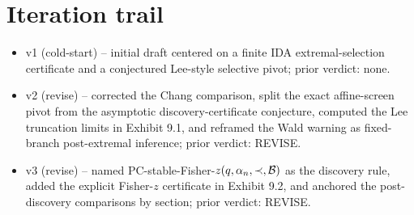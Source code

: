 \documentclass[11pt]{article}
\theoremstyle{definition}
\theoremstyle{plain}
\theoremstyle{remark}
\begin{document}
\section{Iteration trail}
\begin{itemize}[leftmargin=*]
\item v1 (cold-start) -- initial draft centered on a finite IDA extremal-selection certificate and a conjectured Lee-style selective pivot; prior verdict: none.
\item v2 (revise) -- corrected the Chang comparison, split the exact affine-screen pivot from the asymptotic discovery-certificate conjecture, computed the Lee truncation limits in Exhibit 9.1, and reframed the Wald warning as fixed-branch post-extremal inference; prior verdict: REVISE.
\item v3 (revise) -- named PC-stable-Fisher-\(z(q,\alpha_n,\prec,{\cal B})\) as the discovery rule, added the explicit Fisher-\(z\) certificate in Exhibit 9.2, and anchored the post-discovery comparisons by section; prior verdict: REVISE.
\end{itemize}
\end{document}
